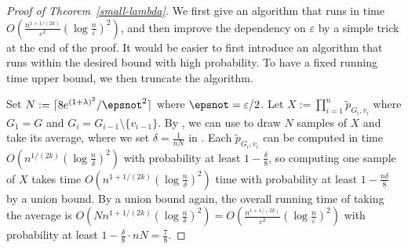 \documentclass{theoretics}
\newcommand{\eps}{\varepsilon}
\newcommand{\defeq}{:=}
\begin{document}
\begin{proof}[Proof of Theorem~\ref{small-lambda}]
  We first give an algorithm that runs in time $O\left(\frac{n^{1+1/(2k)}}{\eps^2}(\log \frac{n}{\eps})^2\right)$, 
  and then improve the dependency on $\eps$ by a simple trick at the end of the proof.
  It would be easier to first introduce an algorithm that runs within the desired bound with high probability.
  To have a fixed running time upper bound, we then truncate the algorithm.

  Set $N\defeq\lceil 8e^{(1+\lambda)^2}/\epsnot^2 \rceil$ where $\epsnot=\eps/2$.
  Let $X\defeq\prod_{i=1}^n \widetilde{p}_{G_i,v_i}$ where $G_1=G$ and $G_i=G_{i-1}\setminus\{v_{i-1}\}$.
  By , we can use  to draw $N$ samples of $X$ and take its average, where we set $\delta=\frac{1}{nN}$ in  .
  Each $\widetilde{p}_{G_i,v_i}$ can be computed in time $O(n^{1/(2k)}(\log \frac{n}{\delta})^2)$ with probability at least $1-\frac{\delta}{8}$, 
  so computing one sample of $X$ takes time $O(n^{1+1/(2k)}(\log \frac{n}{\delta})^2)$ time with probability at least $1-\frac{n\delta}{8}$ by a union bound. 
  By a union bound again, the overall running time of taking the average is $O(Nn^{1+1/(2k)}(\log \frac{n}{\delta})^2)=O\left(\frac{n^{1+1/(2k)}}{\eps^2}(\log \frac{n}{\eps})^2\right)$ 
  with probability at least $1-\frac{\delta}{8}\cdot nN = \frac{7}{8}$.
  


\end{proof}
\end{document}
